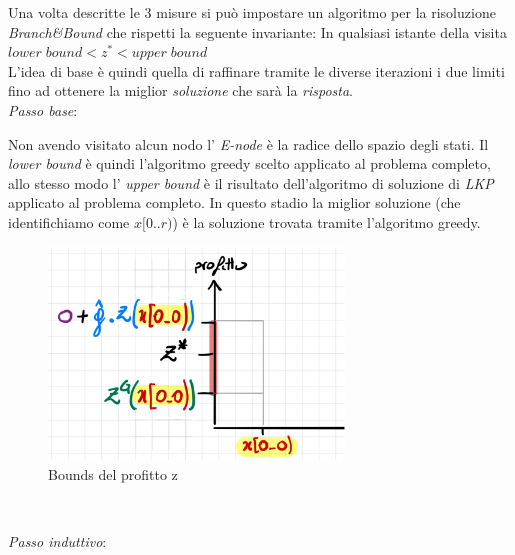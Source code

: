 \documentclass[a4paper]{article}
\begin{document}
Una volta descritte le 3 misure si può impostare un algoritmo per la risoluzione \textit{Branch\&Bound} che rispetti la seguente invariante: In qualsiasi istante della visita $lower \; bound < z^* < upper \; bound$\\
L'idea di base è quindi quella di raffinare tramite le diverse iterazioni i due limiti fino ad ottenere la miglior \emph{soluzione} che sarà la \emph{risposta}.\\
\textit{Passo base}:
\begin{adjustwidth}{.8cm}{0cm}
		Non avendo visitato alcun nodo l' \textit{E-node} è la radice dello spazio degli stati.
		Il \textit{lower bound} è quindi l'algoritmo greedy scelto applicato al problema completo, allo stesso modo l' \textit{upper bound} è il risultato dell'algoritmo di soluzione di \emph{LKP} applicato al problema completo.
		In questo stadio la miglior soluzione (che identifichiamo come $x[0..r)$) è la soluzione trovata tramite l'algoritmo greedy.
\begin{figure}[!ht]
\centering
\includegraphics[width=0.7\textwidth]{./img/C14_profitto_z.png}
\caption{Bounds del profitto z} \label{FIG:C14_profitto_z}
\end{figure}\\
\end{adjustwidth}
\textit{Passo induttivo}:
\end{document}
